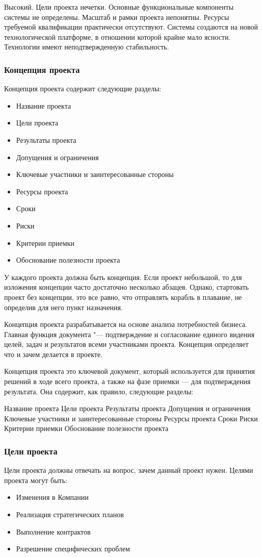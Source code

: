 \documentclass{../industrial-development}
\begin{document}
Высокий. Цели проекта нечетки. Основные функциональные компоненты системы не определены. Масштаб и рамки проекта непонятны. Ресурсы требуемой квалификации практически отсутствуют. Системы создаются на новой технологической платформе, в отношении которой крайне мало ясности. Технологии имеют неподтвержденную стабильность.

    \begin{frame} \frametitle{Концепция проекта}
	Концепция проекта содержит следующие разделы:
	\begin{itemize}
		\item Название проекта
		\item Цели проекта
		\item Результаты проекта
		\item Допущения и ограничения
		\item Ключевые участники и заинтересованные стороны
		\item Ресурсы проекта
		\item Сроки
		\item Риски
		\item Критерии приемки
		\item Обоснование полезности проекта
	\end{itemize}
    \end{frame}
    \lecturenotes

У каждого проекта должна быть концепция. Если проект небольшой, то для изложения концепции часто достаточно несколько абзацев. Однако, стартовать проект без концепции, это все равно, что отправлять корабль в плавание, не определив для него пункт назначения.

Концепция проекта разрабатывается на основе анализа потребностей бизнеса. Главная функция документа "--- подтверждение и согласование единого видения целей, задач и результатов всеми участниками проекта. Концепция определяет что и зачем делается в проекте.

Концепция проекта это ключевой документ, который используется для принятия решений в ходе всего проекта, а также на фазе приемки — для подтверждения результата. Она содержит, как правило, следующие разделы:

Название проекта
Цели проекта
Результаты проекта
Допущения и ограничения
Ключевые участники и заинтересованные стороны
Ресурсы проекта
Сроки
Риски
Критерии приемки
Обоснование полезности проекта

    \begin{frame} \frametitle{Цели проекта}
	Цели проекта должны отвечать на вопрос, зачем данный проект нужен. 
	Целями проекта могут быть:
	\begin{itemize}
		\item Изменения в Компании
		\item Реализация стратегических планов
		\item Выполнение контрактов
		\item Разрешение специфических проблем
	\end{itemize}
    \end{frame}
    \lecturenotes
\end{document}
